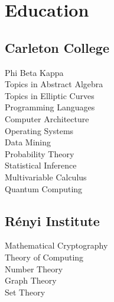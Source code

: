 \documentclass{resume}
\begin{document}

%
%

\begin{minipage}[t]{0.33\textwidth}


\section{Education}

\subsection{Carleton College}
Phi Beta Kappa \\
{}
Topics in Abstract Algebra \\
Topics in Elliptic Curves \\
Programming Languages \\
Computer Architecture \\
Operating Systems \\
Data Mining \\
Probability Theory \\
Statistical Inference \\
Multivariable Calculus \\
Quantum Computing \\
\sectionsep

\subsection{Rényi Institute}
{}
Mathematical Cryptography \\
Theory of Computing \\
Number Theory \\
Graph Theory \\
Set Theory \\
\sectionsep


\end{minipage}
\end{document}

